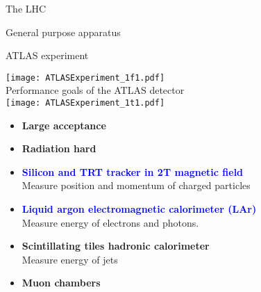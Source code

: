 \documentclass[a4paper]{beamer}
\begin{document}
\begin{frame}{The LHC}
\end{frame}
\begin{frame}{General purpose apparatus}
\end{frame}
\begin{frame}{ATLAS experiment}
  \begin{minipage}{0.49\linewidth}
    \texttt{[image: ATLASExperiment\_1f1.pdf]}\\
    Performance goals of the ATLAS detector\\
    \texttt{[image: ATLASExperiment\_1t1.pdf]}
  \end{minipage}
  \hfill
  \begin{minipage}{0.49\linewidth}
    \begin{itemize}
    \item {\bf Large acceptance}
    \item {\bf Radiation hard}
      \newline
    \item \textcolor{blue}{\bf Silicon and TRT tracker in 2T magnetic field}\\
      Measure position and momentum of charged particles
    \item \textcolor{blue}{\bf Liquid argon electromagnetic calorimeter (LAr)} \\
      Measure energy of electrons and photons.
    \item {\bf Scintillating tiles hadronic calorimeter} \\
      Measure energy of jets
    \item {\bf Muon chambers}
    \end{itemize}
  \end{minipage}\\
\end{frame}
\end{document}
